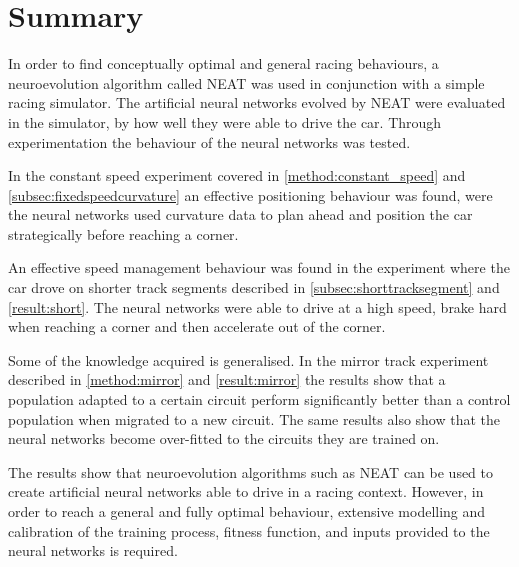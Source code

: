 \chapter{Summary}




In order to find conceptually optimal and general racing behaviours, a neuroevolution algorithm called NEAT was used in conjunction with a simple racing simulator. The artificial neural networks evolved by NEAT were evaluated in the simulator, by how well they were able to drive the car. Through experimentation the behaviour of the neural networks was tested. 

In the constant speed experiment covered in \ref{method:constant_speed} and \ref{subsec:fixedspeedcurvature} an effective positioning behaviour was found, were the neural networks used curvature data to plan ahead and position the car strategically before reaching a corner. 

An effective speed management behaviour was found in the experiment where the car drove on shorter track segments described in \ref{subsec:shorttracksegment} and \ref{result:short}. The neural networks were able to drive at a high speed, brake hard when reaching a corner and then accelerate out of the corner. 

Some of the knowledge acquired is generalised. In the mirror track experiment described in \ref{method:mirror} and \ref{result:mirror} the results show that a population adapted to a certain circuit perform significantly better than a control population when migrated to a new circuit. The same results also show that the neural networks become over-fitted to the circuits they are trained on. 

The results show that neuroevolution algorithms such as NEAT can be used to create artificial neural networks able to drive in a racing context. However, in order to reach a general and fully optimal behaviour, extensive modelling and calibration of the training process, fitness function, and inputs provided to the neural networks is required.  

